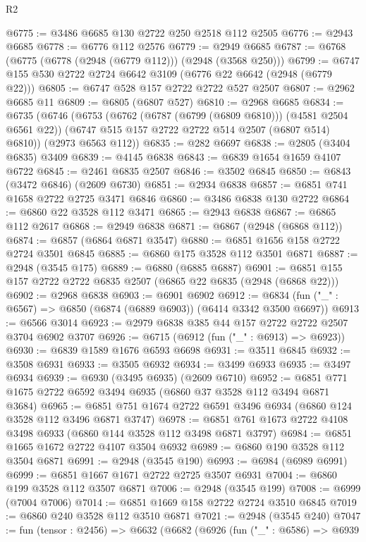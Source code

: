 \begin{lexlean}{R2}
\begin{coremodule}
@6775 := @3486 @6685 @130 @2722 @250 @2518 @112 @2505
@6776 := @2943 @6685
@6778 := @6776 @112 @2576
@6779 := @2949 @6685
@6787 := @6768 (@6775 (@6778 (@2948 (@6779 @112))) (@2948 (@3568 @250)))
@6799 := @6747 @155 @530 @2722 @2724 @6642 @3109 (@6776 @22 @6642 (@2948 (@6779 @22)))
@6805 := @6747 @528 @157 @2722 @2722 @527 @2507
@6807 := @2962 @6685 @11
@6809 := @6805 (@6807 @527)
@6810 := @2968 @6685
@6834 := @6735
    (@6746
      (@6753
        (@6762 (@6787 (@6799 (@6809 @6810))) (@4581 @2504 @6561 @22))
        (@6747 @515 @157 @2722 @2722 @514 @2507 (@6807 @514) @6810))
      (@2973 @6563 @112))
@6835 := @282 @6697
@6838 := @2805 (@3404 @6835) @3409
@6839 := @4145 @6838
@6843 := @6839 @1654 @1659 @4107 @6722
@6845 := @2461 @6835 @2507
@6846 := @3502 @6845
@6850 := @6843 (@3472 @6846) (@2609 @6730)
@6851 := @2934 @6838
@6857 := @6851 @741 @1658 @2722 @2725 @3471 @6846
@6860 := @3486 @6838 @130 @2722
@6864 := @6860 @22 @3528 @112 @3471
@6865 := @2943 @6838
@6867 := @6865 @112 @2617
@6868 := @2949 @6838
@6871 := @6867 (@2948 (@6868 @112))
@6874 := @6857 (@6864 @6871 @3547)
@6880 := @6851 @1656 @158 @2722 @2724 @3501 @6845
@6885 := @6860 @175 @3528 @112 @3501 @6871
@6887 := @2948 (@3545 @175)
@6889 := @6880 (@6885 @6887)
@6901 := @6851 @155 @157 @2722 @2722 @6835 @2507 (@6865 @22 @6835 (@2948 (@6868 @22)))
@6902 := @2968 @6838
@6903 := @6901 @6902
@6912 := @6834 (fun ("_" : @6567) => @6850 (@6874 (@6889 @6903)) (@6414 @3342 @3500 @6697))
@6913 := @6566 @3014
@6923 := @2979 @6838 @385 @44 @157 @2722 @2722 @2507 @3704 @6902 @3707
@6926 := @6715 (@6912 (fun ("_" : @6913) => @6923))
@6930 := @6839 @1589 @1676 @6593 @6698
@6931 := @3511 @6845
@6932 := @3508 @6931
@6933 := @3505 @6932
@6934 := @3499 @6933
@6935 := @3497 @6934
@6939 := @6930 (@3495 @6935) (@2609 @6710)
@6952 := @6851 @771 @1675 @2722 @6592 @3494 @6935 (@6860 @37 @3528 @112 @3494 @6871 @3684)
@6965 := @6851 @751 @1674 @2722 @6591 @3496 @6934 (@6860 @124 @3528 @112 @3496 @6871 @3747)
@6978 := @6851 @761 @1673 @2722 @4108 @3498 @6933 (@6860 @144 @3528 @112 @3498 @6871 @3797)
@6984 := @6851 @1665 @1672 @2722 @4107 @3504 @6932
@6989 := @6860 @190 @3528 @112 @3504 @6871
@6991 := @2948 (@3545 @190)
@6993 := @6984 (@6989 @6991)
@6999 := @6851 @1667 @1671 @2722 @2725 @3507 @6931
@7004 := @6860 @199 @3528 @112 @3507 @6871
@7006 := @2948 (@3545 @199)
@7008 := @6999 (@7004 @7006)
@7014 := @6851 @1669 @158 @2722 @2724 @3510 @6845
@7019 := @6860 @240 @3528 @112 @3510 @6871
@7021 := @2948 (@3545 @240)
@7047 := fun (tensor : @2456) =>
  @6632
    (@6682
      (@6926
        (fun ("_" : @6586) =>
        @6939

\end{coremodule}
\end{lexlean}
